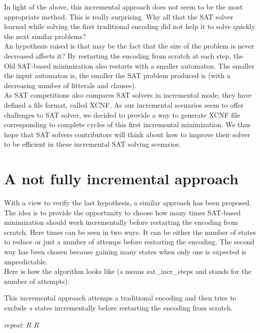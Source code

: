 \noindent In light of the above, this incremental approach does not seem to be the most appropriate method.
This is really surprising. Why all that the SAT solver learned while solving the first traditional encoding
did not help it to solve quickly the next similar problems?\\

An hypothesis raised is that may be the fact that the size of the problem is never decreased affects it? By
restarting the encoding from scratch at each step, the Old SAT-based minimization also restarts with a
smaller automaton. The smaller the input automaton is, the smaller the SAT problem produced is (with a
decreasing number of litterals and clauses).\\

As SAT competitions also compares SAT solvers in incremental mode, they have defined a file format,
called XCNF. As our incremental scenarios seem to offer challenges to SAT solver, we decided to provide
a way to generate XCNF file corresponding to complete cycles of this first incremental minimization. We thus
hope that SAT solvers contributors will think about how to improve their solver to be efficient in
these incremental SAT solving scenarios.

\section{A not fully incremental approach}
\label{approach2}
With a view to verify the last hypothesis, a similar approach has been proposed.
The idea is to provide the opportunity to choose how many times SAT-based
minimization should work incrementally before restarting the encoding from scratch. Here times can be seen
in two ways. It can be either the number of states to reduce or just a number of attemps before
restarting the encoding. The second way has been chosen because gaining many states when only one is
expected is unpredictable.\\

Here is how the algorithm looks like ($s$ means sat\_incr\_steps and stands for the number of attempts).

\begin{algorithm}[H]
 \caption{This incremental approach attemps a traditional encoding and then tries to exclude
          $s$ states incrementally before restarting the encoding from scratch.}
 \label{incr2}
 \begin{algorithmic}[1]
   \BState \emph{repeat}:
    \Return $R$\EndIf
     \Return $R$\EndIf
   \EndFor
  \EndProcedure
 \end{algorithmic}
\end{algorithm}

